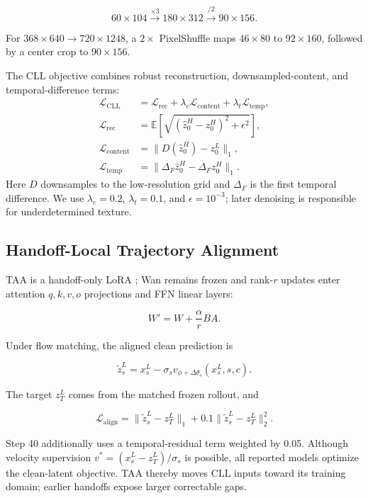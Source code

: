 \[
60\times104 \xrightarrow{\times3} 180\times312
\xrightarrow{/2} 90\times156.
\]

For \(368\times640\rightarrow720\times1248\), a \(2\times\) PixelShuffle maps \(46\times80\) to \(92\times160\), followed by a center crop to \(90\times156\).

The CLL objective combines robust reconstruction, downsampled-content, and temporal-difference terms:
\begin{align}
\mathcal L_{\mathrm{CLL}}&=\mathcal L_{\mathrm{rec}}+\lambda_c\mathcal L_{\mathrm{content}}+\lambda_t\mathcal L_{\mathrm{temp}},\\
\mathcal L_{\mathrm{rec}}&=\mathbb E\!\left[\sqrt{(\widehat z_0^H-z_0^H)^2+\epsilon^2}\right],\\
\mathcal L_{\mathrm{content}}&=\lVert D(\widehat z_0^H)-z_0^L\rVert_1,\\
\mathcal L_{\mathrm{temp}}&=\lVert\Delta_F\widehat z_0^H-\Delta_Fz_0^H\rVert_1.
\end{align}
Here \(D\) downsamples to the low-resolution grid and \(\Delta_F\) is the first temporal difference. We use \(\lambda_c=0.2\), \(\lambda_t=0.1\), and \(\epsilon=10^{-3}\); later denoising is responsible for underdetermined texture.

\subsection{Handoff-Local Trajectory Alignment}

TAA is a handoff-only LoRA \citep{hu2022lora}; Wan remains frozen and rank-\(r\) updates enter attention \(q,k,v,o\) projections and FFN linear layers:

\[
W'=W+\frac{\alpha}{r}BA.
\]

Under flow matching, the aligned clean prediction is

\[
\widetilde z_s^L
=x_s^L-\sigma_s v_{\phi+\Delta\theta_s}(x_s^L,s,c).
\]

The target \(z_T^L\) comes from the matched frozen rollout, and

\[
\mathcal L_{\mathrm{align}}
=\lVert\widetilde z_s^L-z_T^L\rVert_1
+0.1\lVert\widetilde z_s^L-z_T^L\rVert_2^2.
\]

Step 40 additionally uses a temporal-residual term weighted by 0.05. Although velocity supervision \(v^*=(x_s^L-z_T^L)/\sigma_s\) is possible, all reported models optimize the clean-latent objective. TAA thereby moves CLL inputs toward its training domain; earlier handoffs expose larger correctable gaps.

